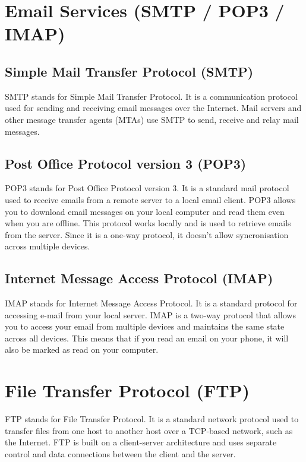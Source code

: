 \documentclass[12pt,titlepage]{article}
\begin{document}
\section{Email Services (SMTP / POP3 / IMAP)}

\subsection{Simple Mail Transfer Protocol (SMTP)}

SMTP stands for Simple Mail Transfer Protocol. It is a communication protocol used for sending
and receiving email messages over the Internet. Mail servers and other message transfer agents (MTAs)
use SMTP to send, receive and relay mail messages. \cite{aws-smtp}

\subsection{Post Office Protocol version 3 (POP3)}

POP3 stands for Post Office Protocol version 3. It is a standard mail protocol used to receive emails from a remote server to a local email client. POP3 allows you to download
email messages on your local computer and read them even when you are offline. This protocol works locally
and is used to retrieve emails from the server. Since it is a one-way protocol, it doesn't allow syncronisation across multiple
devices. \cite{microsoft-imap-pop3}

\subsection{Internet Message Access Protocol (IMAP)}

IMAP stands for Internet Message Access Protocol. It is a standard protocol for accessing e-mail from your
local server. IMAP is a two-way protocol that allows you to access your email from multiple devices and
maintains the same state across all devices. This means that if you read an email on your phone, it will
also be marked as read on your computer. \cite{microsoft-imap-pop3}

\section{File Transfer Protocol (FTP)}

FTP stands for File Transfer Protocol. It is a standard network protocol used to transfer files from one host
to another host over a TCP-based network, such as the Internet. FTP is built on a client-server architecture
and uses separate control and data connections between the client and the server.
\end{document}
